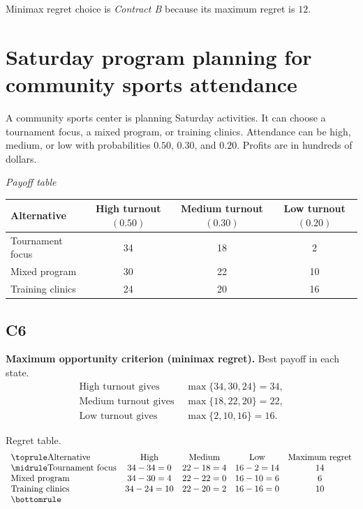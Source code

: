 \begin{ExamProblems}
		Minimax regret choice is \emph{Contract B} because its maximum regret is $12$.

		\item
		\section{Saturday program planning for community sports attendance}
		A community sports center is planning Saturday activities. It can choose a tournament focus, a mixed program, or training clinics. Attendance can be high, medium, or low with probabilities $0.50$, $0.30$, and $0.20$. Profits are in hundreds of dollars.

		\begin{center}
			\textit{Payoff table}\\
			\begin{tabular}{l c c c}
				\toprule
				Alternative & High turnout $(0.50)$ & Medium turnout $(0.30)$ & Low turnout $(0.20)$ \\
				\midrule
				Tournament focus & 34 & 18 & 2 \\
				Mixed program & 30 & 22 & 10 \\
				Training clinics & 24 & 20 & 16 \\
				\bottomrule
			\end{tabular}
		\end{center}

		\subsection*{C6}
		\textbf{Maximum opportunity criterion (minimax regret).} Best payoff in each state.
		\[
		\begin{aligned}
		\text{High turnout gives } &\max\{34,30,24\}=34,\\
		\text{Medium turnout gives } &\max\{18,22,20\}=22,\\
		\text{Low turnout gives } &\max\{2,10,16\}=16.
		\end{aligned}
		\]

		Regret table.
		\[
		\begin{array}{lcccc}
			\toprule
			\text{Alternative} & \text{High} & \text{Medium} & \text{Low} & \text{Maximum regret}\\
			\midrule
			\text{Tournament focus} & 34-34=0 & 22-18=4 & 16-2=14 & 14\\
			\text{Mixed program} & 34-30=4 & 22-22=0 & 16-10=6 & 6\\
			\text{Training clinics} & 34-24=10 & 22-20=2 & 16-16=0 & 10\\
			\bottomrule
		\end{array}
		\]


\end{ExamProblems}
